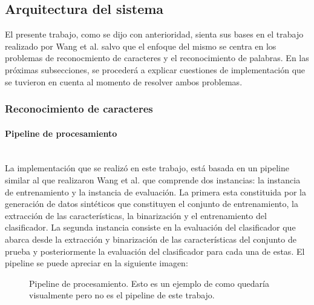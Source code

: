 \subsection{Arquitectura del sistema}
\label{subsection:impl_propia}

	El presente trabajo, como se dijo con anterioridad, sienta sus bases en el trabajo realizado por Wang et al. salvo que el enfoque del mismo se centra en los problemas de reconocmiento de caracteres y el reconocimiento de palabras. En las próximas subsecciones, se procederá a explicar cuestiones de implementación que se tuvieron en cuenta al momento de resolver ambos problemas.

	\subsubsection{Reconocimiento de caracteres}

		\paragraph{Pipeline de procesamiento} ~\\

			La implementación que se realizó en este trabajo, está basada en un pipeline similar al que realizaron Wang et al. que comprende dos instancias: la instancia de entrenamiento y la instancia de evaluación. La primera esta constituida por la generación de datos sintéticos que constituyen el conjunto de entrenamiento, la extracción de las características, la binarización y el entrenamiento del clasificador. La segunda instancia consiste en la evaluación del clasificador que abarca desde la extracción y binarización de las características del conjunto de prueba y posteriormente la evaluación del clasificador para cada una de estas. El pipeline se puede apreciar en la siguiente imagen:

			\begin{figure}[htbp]
				\centering
				\caption{Pipeline de procesamiento. Esto es un ejemplo de como quedaría visualmente pero no es el pipeline de este trabajo.}
				\label{fig: Pipeline de mi sistema}
			\end{figure}

